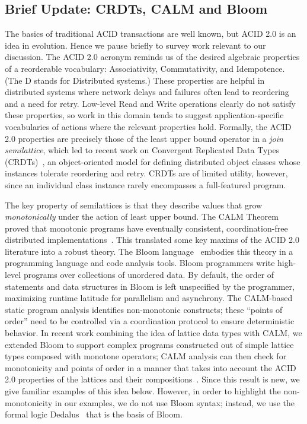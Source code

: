 \documentclass{sig-alternate}
\begin{document}
\subsection{Brief Update: CRDTs, CALM and Bloom}
The basics of traditional ACID transactions are well known, but ACID 2.0 is an
idea in evolution.  Hence we pause briefly to survey work relevant to our discussion.  The ACID 2.0
acronym reminds us of the desired algebraic properties of a reorderable
vocabulary: Associativity, Commutativity, and Idempotence. (The D stands for
Distributed systems.)  These properties are helpful in distributed systems where
network delays and failures often lead to reordering and a need for
retry. Low-level Read and Write operations clearly do not satisfy these
properties, so work in this domain tends to suggest application-specific
vocabularies of actions where the relevant properties hold.  Formally, the ACID
2.0 properties are precisely those of the least upper bound operator in a \emph{join
  semilattice}, which led to recent work on Convergent Replicated Data Types
(CRDTs)~\cite{Shapiro2011a,Shapiro2011b}, an object-oriented model for defining
distributed object classes whose instances tolerate reordering and retry. CRDTs
are of limited utility, however, since an individual class instance rarely
encompasses a full-featured program.


The key property of semilattices is that they describe values that grow
\emph{monotonically} under the action of least upper bound.  The CALM
  Theorem proved that monotonic programs have eventually consistent,
coordination-free distributed
implementations~\cite{Alvaro2011,Ameloot2011,Hellerstein2010}.  This translated some key maxims of the ACID 2.0 literature into a robust theory.  The Bloom language~\cite{Alvaro2011} embodies this theory in a programming language and code analysis tools.  Bloom programmers write high-level programs over collections of unordered data.  By default, the order of statements and data structures in Bloom is left unspecified by the programmer, maximizing runtime latitude for parallelism and asynchrony.  The CALM-based static program analysis identifies non-monotonic constructs; these ``points of order'' need to be controlled via a coordination protocol to ensure deterministic behavior.  In recent work combining the idea of lattice data types with CALM, we extended Bloom to support complex programs constructed out of simple lattice types composed 
with monotone operators; CALM analysis can then check for monotonicity and
points of order in a manner that takes into account the ACID 2.0 properties of
the lattices and their compositions~\cite{Conway2012}.  Since this result is new, we give familiar examples of this idea below.  However, in order to highlight the non-monotonicity in our examples, we do not use Bloom syntax; instead, we use the formal logic Dedalus~\cite{dedalus} that is the basis of Bloom.
\end{document}
